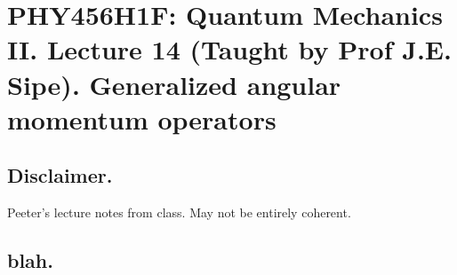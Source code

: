 
%

\chapter{PHY456H1F: Quantum Mechanics II.  Lecture 14 (Taught by Prof J.E. Sipe).  Generalized angular momentum operators}
\label{chap:qmTwoL14}
{}
\date{Oct XX, 2011}

\beginArtWithToc

\section{Disclaimer.}

Peeter's lecture notes from class.  May not be entirely coherent.

\section{blah.}

\cite{desai2009quantum}

\EndArticle

